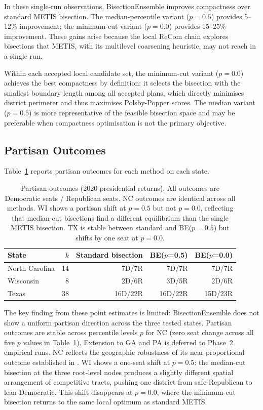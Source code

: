In these single-run observations, BisectionEnsemble improves compactness over
standard METIS bisection.
The median-percentile variant ($p=0.5$) provides 5--12\% improvement; the
minimum-cut variant ($p=0.0$) provides 15--25\% improvement. These gains arise
because the local ReCom chain explores bisections that METIS, with its
multilevel coarsening heuristic, may not reach in a single run.

Within each accepted local candidate set, the minimum-cut variant ($p=0.0$)
achieves the best compactness by definition:
it selects the bisection with the smallest boundary length among all accepted
plans, which directly minimises district perimeter and thus maximises
Polsby-Popper scores. The median variant ($p=0.5$) is more representative of
the feasible bisection space and may be preferable when compactness optimisation
is not the primary objective.

\subsection{Partisan Outcomes}
\label{sec:results:partisan}

Table~\ref{tab:partisan} reports partisan outcomes for each method on each state.

\begin{table}[h]
\centering
\begin{tabular}{lrrrr}
\toprule
State & $k$ & Standard bisection & BE($p$=0.5) & BE($p$=0.0) \\
\midrule
North Carolina & 14 & 7D/7R & 7D/7R & 7D/7R \\
Wisconsin      & 8  & 2D/6R & 3D/5R & 2D/6R \\
Texas          & 38 & 16D/22R & 16D/22R & 15D/23R \\
\bottomrule
\end{tabular}
\caption{Partisan outcomes (2020 presidential returns). All outcomes are
  Democratic seats / Republican seats. NC outcomes are identical across all
  methods. WI shows a partisan shift at $p=0.5$ but not $p=0.0$, reflecting
  that median-cut bisections find a different equilibrium than the single METIS
  bisection. TX is stable between standard and BE($p=0.5$) but shifts by one seat
  at $p=0.0$.}
\label{tab:partisan}
\end{table}

The key finding from these point estimates is limited: BisectionEnsemble does
not show a uniform partisan direction across the three tested states.
Partisan outcomes are stable across percentile levels $p$ for NC (zero seat
change across all five $p$ values in Table~\ref{tab:partisan}). Extension to
GA and PA is deferred to Phase~2 empirical runs.
NC reflects the geographic robustness of its near-proportional outcome
established in \citet{dellaLibera2026apportion}. WI shows a one-seat shift
at $p=0.5$: the median-cut bisection at the three root-level nodes produces
a slightly different spatial arrangement of competitive tracts, pushing one
district from safe-Republican to lean-Democratic. This shift disappears at
$p=0.0$, where the minimum-cut bisection returns to the same local optimum
as standard METIS.

